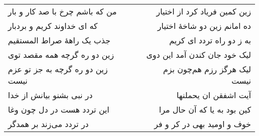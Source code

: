 \begin{center}
\begin{longtable}{l p{0.5cm} r}
من که باشم چرخ با صد کار و بار
&&
زین کمین فریاد کرد از اختیار
\\
که ای خداوند کریم و بردبار
&&
ده امانم زین دو شاخهٔ اختیار
\\
جذب یک راههٔ صراط المستقیم
&&
به ز دو راه تردد ای کریم
\\
زین دو ره گرچه همه مقصد توی
&&
لیک خود جان کندن آمد این دوی
\\
زین دو ره گرچه به جز تو عزم نیست
&&
لیک هرگز رزم هم‌چون بزم نیست
\\
در نبی بشنو بیانش از خدا
&&
آیت اشفقن ان یحملنها
\\
این تردد هست در دل چون وغا
&&
کین بود به یا که آن حال مرا
\\
در تردد می‌زند بر همدگر
&&
خوف و اومید بهی در کر و فر
\\
\end{longtable}
\end{center}
